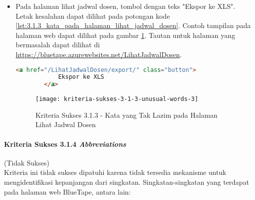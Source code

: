 \begin{itemize}
    \item Pada halaman lihat jadwal dosen, tombol dengan teks "Ekspor ke XLS". Letak kesalahan dapat dilihat pada potongan kode \ref{lst:3.1.3_kata_pada_halaman_lihat_jadwal_dosen}. Contoh tampilan pada halaman web dapat dilihat pada gambar \ref{fig:3.1.3_unusual_words_3}. Tautan untuk halaman yang bermasalah dapat dilihat di \url{https://bluetape.azurewebsites.net/LihatJadwalDosen}.
    \begin{lstlisting}[frame=single, label={lst:3.1.3_kata_pada_halaman_lihat_jadwal_dosen}, language=HTML, caption=Kriteria Sukses 3.1.3 - Kata yang Tak Lazim pada Halaman Lihat Jadwal Dosen]
        <a href="/LihatJadwalDosen/export/" class="button">
            Ekspor ke XLS
        </a>
    \end{lstlisting}
    
    \begin{figure}[H]
        \centering  
        \texttt{[image: kriteria-sukses-3-1-3-unusual-words-3]}  
        \caption[Kriteria Sukses 3.1.3 - Kata yang Tak Lazim pada Halaman Lihat Jadwal Dosen]{Kriteria Sukses 3.1.3 - Kata yang Tak Lazim pada Halaman Lihat Jadwal Dosen}
        \label{fig:3.1.3_unusual_words_3}  
    \end{figure}
    
\end{itemize}

\paragraph{Kriteria Sukses 3.1.4 \textit{Abbreviations}}
\label{par:kepatuhan_bluetape_kriteria_sukses_3.1.4}
(Tidak Sukses)\\

Kriteria ini tidak sukses dipatuhi karena tidak tersedia mekanisme untuk mengidentifikasi kepanjangan dari singkatan. Singkatan-singkatan yang terdapat pada halaman web BlueTape, antara lain:

